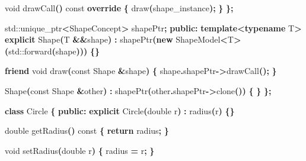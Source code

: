 \documentclass[14pt,a4paper]{article}
\newenvironment{Shaded}{\begin{paragraph}}{\end{paragraph}}
\newenvironment{Highlighting}{\begin{paragraph}}{\end{paragraph}}
\newcommand{\KeywordTok}[1]{\textcolor[rgb]{0.13,0.29,0.53}{\textbf{#1}}}
\newcommand{\DataTypeTok}[1]{\textcolor[rgb]{0.13,0.29,0.53}{#1}}
\newcommand{\ControlFlowTok}[1]{\textcolor[rgb]{0.13,0.29,0.53}{\textbf{#1}}}
\newcommand{\OperatorTok}[1]{\textcolor[rgb]{0.81,0.36,0.00}{\textbf{#1}}}
\newcommand{\BuiltInTok}[1]{#1}
\newcommand{\AttributeTok}[1]{\textcolor[rgb]{0.77,0.63,0.00}{#1}}
\newcommand{\NormalTok}[1]{#1}
\begin{document}
\begin{Shaded}
\begin{Highlighting}[]
        \DataTypeTok{void}\NormalTok{ drawCall}\OperatorTok{()} \AttributeTok{const} \KeywordTok{override} \OperatorTok{\{}
\NormalTok{            draw}\OperatorTok{(}\NormalTok{shape\_instance}\OperatorTok{);}
        \OperatorTok{\}}
    \OperatorTok{\};}

    \BuiltInTok{std::}\NormalTok{unique\_ptr}\OperatorTok{\textless{}}\NormalTok{ShapeConcept}\OperatorTok{\textgreater{}}\NormalTok{ shapePtr}\OperatorTok{;}
\KeywordTok{public}\OperatorTok{:}
    \KeywordTok{template}\OperatorTok{\textless{}}\KeywordTok{typename}\NormalTok{ T}\OperatorTok{\textgreater{}}
    \KeywordTok{explicit}\NormalTok{ Shape}\OperatorTok{(}\NormalTok{T }\OperatorTok{\&\&}\NormalTok{shape}\OperatorTok{)} 
        \OperatorTok{:}\NormalTok{ shapePtr}\OperatorTok{(}\KeywordTok{new}\NormalTok{ ShapeModel}\OperatorTok{\textless{}}\NormalTok{T}\OperatorTok{\textgreater{}(}\BuiltInTok{std::}\NormalTok{forward}\OperatorTok{(}\NormalTok{shape}\OperatorTok{)))} \OperatorTok{\{\}}

    \KeywordTok{friend} \DataTypeTok{void}\NormalTok{ draw}\OperatorTok{(}\AttributeTok{const}\NormalTok{ Shape }\OperatorTok{\&}\NormalTok{shape}\OperatorTok{)} \OperatorTok{\{}
\NormalTok{        shape}\OperatorTok{.}\NormalTok{shapePtr}\OperatorTok{{-}\textgreater{}}\NormalTok{drawCall}\OperatorTok{();}
    \OperatorTok{\}}

\NormalTok{    Shape}\OperatorTok{(}\AttributeTok{const}\NormalTok{ Shape }\OperatorTok{\&}\NormalTok{other}\OperatorTok{)} \OperatorTok{:}\NormalTok{ shapePtr}\OperatorTok{(}\NormalTok{other}\OperatorTok{.}\NormalTok{shapePtr}\OperatorTok{{-}\textgreater{}}\NormalTok{clone}\OperatorTok{())} \OperatorTok{\{}
    \OperatorTok{\}}
\OperatorTok{\};}


\KeywordTok{class}\NormalTok{ Circle }\OperatorTok{\{}
\KeywordTok{public}\OperatorTok{:}
    \KeywordTok{explicit}\NormalTok{ Circle}\OperatorTok{(}\DataTypeTok{double}\NormalTok{ r}\OperatorTok{)}
            \OperatorTok{:}\NormalTok{ radius}\OperatorTok{(}\NormalTok{r}\OperatorTok{)} \OperatorTok{\{\}}

    \DataTypeTok{double}\NormalTok{ getRadius}\OperatorTok{()} \AttributeTok{const} \OperatorTok{\{}
        \ControlFlowTok{return}\NormalTok{ radius}\OperatorTok{;}
    \OperatorTok{\}}

    \DataTypeTok{void}\NormalTok{ setRadius}\OperatorTok{(}\DataTypeTok{double}\NormalTok{ r}\OperatorTok{)} \OperatorTok{\{}
\NormalTok{        radius }\OperatorTok{=}\NormalTok{ r}\OperatorTok{;}
    \OperatorTok{\}}


\end{Highlighting}
\end{Shaded}
\end{document}
